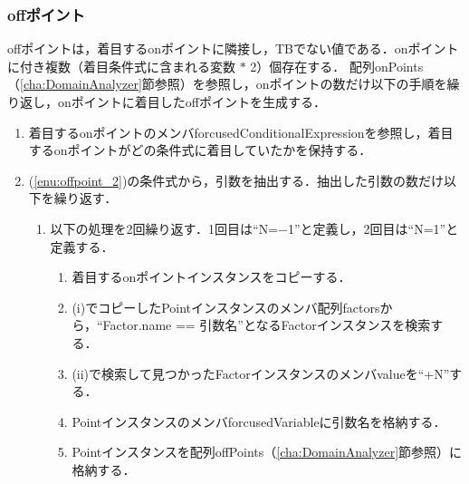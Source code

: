 \documentclass[uplatex, report, a4j, 10pt]{jsbook}
\begin{document}
\subsubsection{offポイント}
offポイントは，着目するonポイントに隣接し，TBでない値である．onポイントに付き複数（着目条件式に含まれる変数 $*$ 2）個存在する．
配列onPoints（\ref{cha:DomainAnalyzer}節参照）を参照し，onポイントの数だけ以下の手順を繰り返し，onポイントに着目したoffポイントを生成する．
\begin{enumerate}
	\item\label{enu:offpoint_2} 着目するonポイントのメンバforcusedConditionalExpressionを参照し，着目するonポイントがどの条件式に着目していたかを保持する．
	\item (\ref{enu:offpoint_2})の条件式から，引数を抽出する．抽出した引数の数だけ以下を繰り返す．
	\begin{enumerate}
		\item 以下の処理を2回繰り返す．1回目は“N=$-$1”と定義し，2回目は“N=1”と定義する．
		      \begin{enumerate}
		      	\item\label{enu:offpoint_3} 着目するonポイントインスタンスをコピーする．
		      	\item\label{enu:offpoint_1} (i)でコピーしたPointインスタンスのメンバ配列factorsから，“Factor.name == 引数名”となるFactorインスタンスを検索する．
		      	\item (ii)で検索して見つかったFactorインスタンスのメンバvalueを“+N”する．
		      	\item PointインスタンスのメンバforcusedVariableに引数名を格納する．
		      	\item Pointインスタンスを配列offPoints（\ref{cha:DomainAnalyzer}節参照）に格納する．
		      \end{enumerate}
	\end{enumerate}
\end{enumerate}
\end{document}
